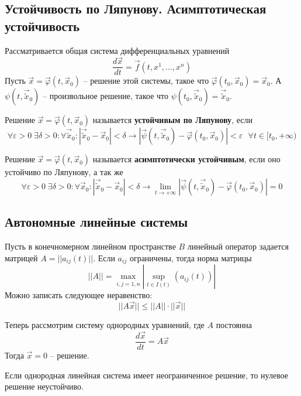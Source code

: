 \subsection{Устойчивость по Ляпунову. Асимптотическая устойчивость}
Рассматривается общая система дифференциальных уравнений
\begin{equation}
	\frac{d\vec{x}}{dt} = \vec{f}(t, x^1, \dots, x^n)
\end{equation}
Пусть $\vec{x} = \vec{\varphi}(t, \vec{x}_0)$ -- решение этой системы, такое что $\vec{\varphi}(t_0, \vec{x}_0) = \vec{x}_0$. А $\psi(t, \vec{\tilde{x}}_0)$ -- произвольное решение, такое что $\psi(t_0, \vec{\tilde{x}}_0) = \vec{\tilde{x}}_0$.
\begin{definition}
	Решение $\vec{x} = \vec{\varphi}(t, \vec{x}_0)$ называется \textbf{устойчивым по Ляпунову}, если
	\[
	\forall \varepsilon > 0 \; \exists \delta > 0:\forall \vec{\tilde{x}}_0: |\vec{\tilde{x}}_0 - \vec{x}_0|<\delta \to |\vec{\psi}(t, \vec{\tilde{x}}_0) -  \vec{\varphi}(t_0, \vec{x}_0)|<\varepsilon\text{ } \forall t\in [t_0, +\infty)
	\]
\end{definition}

\begin{definition}
	Решение $\vec{x} = \vec{\varphi}(t, \vec{x}_0)$ называется \textbf{асимптотически устойчивым}, если оно устойчиво по Ляпунову, а так же
	\[
	\forall \varepsilon > 0 \; \exists \delta > 0:\forall \vec{x}_0: |\vec{\tilde{x}}_0 - \vec{x}_0|<\delta \to \lim_{t\to+\infty}|\vec{\psi}(t, \vec{\tilde{x}}_0) -  \vec{\varphi}(t_0, \vec{x}_0)|=0
	\]
\end{definition}

\subsection{Автономные линейные системы}

Пусть в конечномерном линейном пространстве $B$ линейный оператор задается матрицей $A=||a_{ij}(t)||$. Если $a_{ij}$ ограничены, тогда норма матрицы 
\[
||A|| = \max_{i,j =\overline{1,n}}|\sup_{t\in I(t)}(a_{ij}(t))|
\]
Можно записать следующее неравенство:
\[
||A\vec{x}||\leqslant ||A||\cdot||\vec{x}||
\]

Теперь рассмотрим систему однородных уравнений, где $A$ постоянна
\begin{equation}
	\frac{d\vec{x}}{dt} = A\vec{x}
	\label{equ:issue12sys}
\end{equation}
Тогда $\vec{x} = 0$ -- решение.

\begin{lemma}
	Если однородная линейная система имеет неограниченное решение, то нулевое решение неустойчиво.
\end{lemma}

